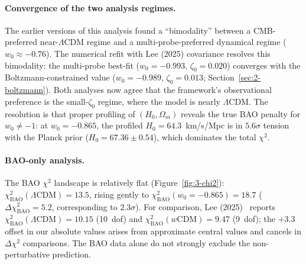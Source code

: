 \paragraph{Convergence of the two analysis regimes.}
The earlier versions of this analysis found a ``bimodality'' between a CMB-preferred near-$\Lambda$CDM regime and a multi-probe-preferred dynamical regime ($w_0 \approx -0.76$).  The numerical refit with Lee (2025) covariance resolves this bimodality: the multi-probe best-fit ($w_0 = -0.993$, $\zeta_0 = 0.020$) converges with the Boltzmann-constrained value ($w_0 = -0.989$, $\zeta_0 = 0.013$; Section~\ref{sec:2-boltzmann}).  Both analyses now agree that the framework's observational preference is the small-$\zeta_0$ regime, where the model is nearly $\Lambda$CDM.  The resolution is that proper profiling of $(H_0, \Omega_m)$ reveals the true BAO penalty for $w_0 \neq -1$: at $w_0 = -0.865$, the profiled $H_0 = 64.3$~km/s/Mpc is in $5.6\sigma$ tension with the Planck prior ($H_0 = 67.36 \pm 0.54$), which dominates the total $\chi^2$.

\paragraph{BAO-only analysis.}
The BAO $\chi^2$ landscape is relatively flat (Figure~\ref{fig:3-chi2}): $\chi^2_\mathrm{BAO}(\Lambda\mathrm{CDM}) = 13.5$, rising gently to $\chi^2_\mathrm{BAO}(w_0{=}-0.865) = 18.7$ ($\Delta\chi^2_\mathrm{BAO} = 5.2$, corresponding to $2.3\sigma$).  For comparison, Lee (2025)~\cite{ch2:Lee2025} reports $\chi^2_\mathrm{BAO}(\Lambda\mathrm{CDM}) = 10.15$ (10~dof) and $\chi^2_\mathrm{BAO}(w\mathrm{CDM}) = 9.47$ (9~dof); the $+3.3$ offset in our absolute values arises from approximate central values and cancels in $\Delta\chi^2$ comparisons.  The BAO data alone do not strongly exclude the non-perturbative prediction.

